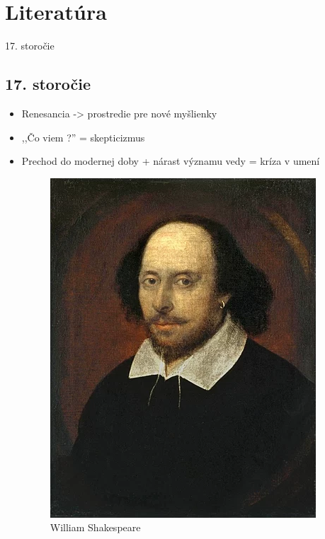 \documentclass[dvipsnames]{beamer}
\begin{document}
\section{Literatúra}
\frame{\sectionpage}

\begin{frame}{17. storočie}
	\subsection{17. storočie}
	\begin{itemize}
		\item Renesancia -> prostredie pre nové myšlienky
		\item ,,Čo viem ?'' = skepticizmus
		\item Prechod do modernej doby + nárast významu vedy = kríza v umení
		      \begin{minipage}[t]{0.4\textwidth}
			      \kern0pt

			      \begin{figure}
				      \includegraphics[scale=0.2]{pivo}
				      \caption{William Shakespeare}
			      \end{figure}
		      \end{minipage}%
		      \begin{minipage}[t]{0.6\textwidth}
			      \kern0pt


\end{minipage}
\end{itemize}
\end{frame}
\end{document}

